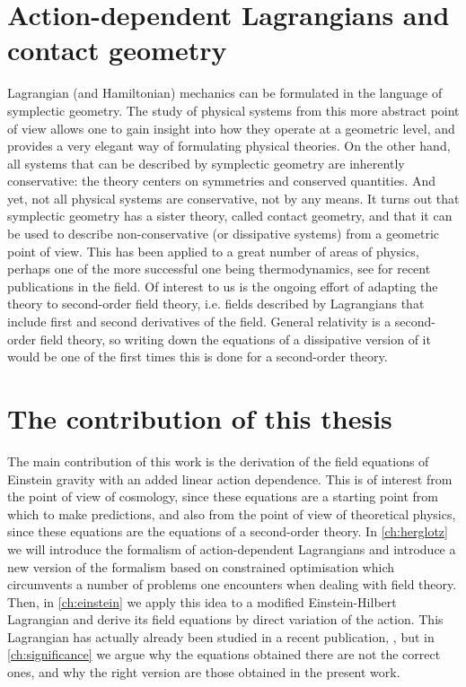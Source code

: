 \documentclass[../main.tex]{subfiles}
\begin{document}
\section{Action-dependent Lagrangians and contact geometry}
Lagrangian (and Hamiltonian) mechanics can be formulated in the language of symplectic
geometry. The study of physical systems from this more abstract point of view allows one
to gain insight into how they operate at a geometric level, and provides a very elegant
way of formulating physical theories. On the other hand, all systems that can be described
by symplectic geometry are inherently conservative: the theory centers on symmetries and
conserved quantities. And yet, not all physical systems are conservative, not by any
means. It turns out that symplectic geometry has a sister theory, called contact geometry,
and that it can be used to describe non-conservative (or dissipative systems) from a
geometric point of view. This has been applied to a great number of areas of physics,
perhaps one of the more successful one being thermodynamics, see \cite{Gaset2020a,
Leon2021, Gaset2020} for recent publications in the field. Of interest to us
is the ongoing effort of adapting the theory to second-order field theory, i.e.
fields described by Lagrangians that include first and second derivatives of the field.
General relativity is a second-order field theory, so writing down the equations of a
dissipative version of it would be one of the first times this is done for a second-order
theory. 

\section{The contribution of this thesis}
The main contribution of this work is the derivation of the field equations of Einstein
gravity with an added linear action dependence. This is of interest from the point of view
of cosmology, since these equations are a starting point from which to make predictions,
and also from the point of view of theoretical physics, since these equations are the
equations of a second-order theory. In \cref{ch:herglotz} we will introduce the formalism
of action-dependent Lagrangians and introduce a new version of the formalism based on
constrained optimisation which circumvents a number of problems one encounters when
dealing with field theory. Then, in \cref{ch:einstein} we apply this idea to a modified
Einstein-Hilbert Lagrangian and derive its field equations by direct variation of the
action. This Lagrangian has actually already been studied in a recent publication,
\cite{Lazo2017}, but in \cref{ch:significance} we argue why the equations obtained there
are not the correct ones, and why the right version are those obtained in the present
work. 
\end{document}
